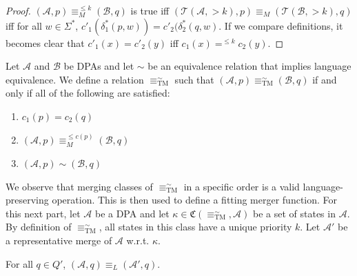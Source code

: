 \begin{proof}
	$(\mathcal{A}, p) \equiv_M^{\leq k} (\mathcal{B}, q)$ is true iff $(\mathcal{T}(\mathcal{A}, >k), p) \equiv_M (\mathcal{T}(\mathcal{B}, >k), q)$ iff for all $w \in \Sigma^*$, $c'_1(\delta_1^*(p, w)) = c'_2(\delta_2^*(q, w)$. If we compare definitions, it becomes clear that $c'_1(x) = c'_2(y)$ iff $c_1(x) =^{\leq k} c_2(y)$.
\end{proof}

\vspace{5pt}

\begin{defn}
	Let $\mathcal{A}$ and $\mathcal{B}$ be DPAs and let $\sim$ be an equivalence relation that implies language equivalence. We define a relation $\equiv_\text{TM}^\sim$ such that $(\mathcal{A}, p) \equiv^\sim_\text{TM} (\mathcal{B}, q)$ if and only if all of the following are satisfied:
	\begin{enumerate}
		\item $c_1(p) = c_2(q)$
		\item $(\mathcal{A}, p) \equiv_M^{\leq c(p)} (\mathcal{B}, q)$
		\item $(\mathcal{A}, p) \sim (\mathcal{B}, q)$
	\end{enumerate}
\end{defn}

\vspace{5pt}

We observe that merging classes of $\equiv_\text{TM}^\sim$ in a specific order is a valid language-preserving operation. This is then used to define a fitting merger function. For this next part, let $\mathcal{A}$ be a DPA and let $\kappa \in \mathfrak{C}(\equiv^\sim_\text{TM}, \mathcal{A})$ be a set of states in $\mathcal{A}$. By definition of $\equiv^\sim_\text{TM}$, all states in this class have a unique priority $k$. Let $\mathcal{A}'$ be a representative merge of $\mathcal{A}$ w.r.t. $\kappa$.

\begin{lem}
	For all $q \in Q'$, $(\mathcal{A}, q) \equiv_L (\mathcal{A}', q)$.
	\label{lem:tremoore:merge_keep_lang}
\end{lem}


